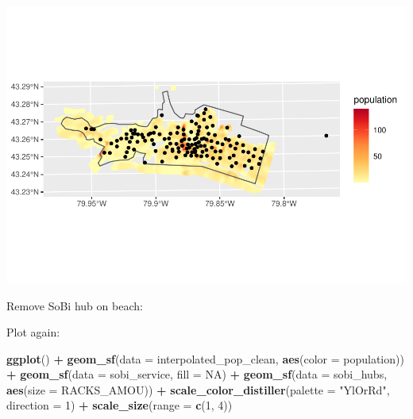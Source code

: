 \documentclass[
]{article}
\newenvironment{Shaded}{\begin{snugshade}}{\end{snugshade}}
\newcommand{\DataTypeTok}[1]{\textcolor[rgb]{0.13,0.29,0.53}{#1}}
\newcommand{\DecValTok}[1]{\textcolor[rgb]{0.00,0.00,0.81}{#1}}
\newcommand{\KeywordTok}[1]{\textcolor[rgb]{0.13,0.29,0.53}{\textbf{#1}}}
\newcommand{\NormalTok}[1]{#1}
\newcommand{\OperatorTok}[1]{\textcolor[rgb]{0.81,0.36,0.00}{\textbf{#1}}}
\newcommand{\OtherTok}[1]{\textcolor[rgb]{0.56,0.35,0.01}{#1}}
\newcommand{\StringTok}[1]{\textcolor[rgb]{0.31,0.60,0.02}{#1}}
\begin{document}
\includegraphics{00-Data-Processing-Example_files/figure-latex/unnamed-chunk-87-1.pdf}

Remove SoBi hub on beach:

\begin{Shaded}
\end{Shaded}

Plot again:

\begin{Shaded}
\begin{Highlighting}[]
\KeywordTok{ggplot}\NormalTok{() }\OperatorTok{+}\StringTok{ }
\StringTok{  }\KeywordTok{geom_sf}\NormalTok{(}\DataTypeTok{data =}\NormalTok{ interpolated_pop_clean,}
          \KeywordTok{aes}\NormalTok{(}\DataTypeTok{color =}\NormalTok{ population)) }\OperatorTok{+}
\StringTok{  }\KeywordTok{geom_sf}\NormalTok{(}\DataTypeTok{data =}\NormalTok{ sobi_service,}
          \DataTypeTok{fill =} \OtherTok{NA}\NormalTok{) }\OperatorTok{+}
\StringTok{  }\KeywordTok{geom_sf}\NormalTok{(}\DataTypeTok{data =}\NormalTok{ sobi_hubs,}
          \KeywordTok{aes}\NormalTok{(}\DataTypeTok{size =}\NormalTok{ RACKS_AMOU)) }\OperatorTok{+}
\StringTok{  }\KeywordTok{scale_color_distiller}\NormalTok{(}\DataTypeTok{palette =} \StringTok{"YlOrRd"}\NormalTok{, }
                        \DataTypeTok{direction =} \DecValTok{1}\NormalTok{) }\OperatorTok{+}
\StringTok{  }\KeywordTok{scale_size}\NormalTok{(}\DataTypeTok{range =} \KeywordTok{c}\NormalTok{(}\DecValTok{1}\NormalTok{, }\DecValTok{4}\NormalTok{))}
\end{Highlighting}
\end{Shaded}
\end{document}
